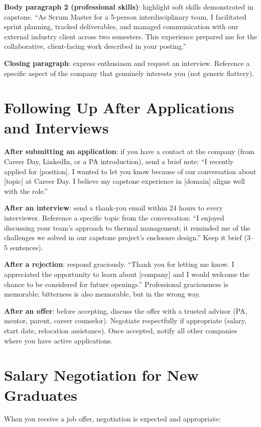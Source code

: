 \textbf{Body paragraph 2 (professional skills)}: highlight soft skills demonstrated in capstone. ``As Scrum Master for a 5-person interdisciplinary team, I facilitated sprint planning, tracked deliverables, and managed communication with our external industry client across two semesters. This experience prepared me for the collaborative, client-facing work described in your posting.''

\textbf{Closing paragraph}: express enthusiasm and request an interview. Reference a specific aspect of the company that genuinely interests you (not generic flattery).

\section{Following Up After Applications and Interviews}
\textbf{After submitting an application}: if you have a contact at the company (from Career Day, LinkedIn, or a PA introduction), send a brief note: ``I recently applied for [position]. I wanted to let you know because of our conversation about [topic] at Career Day. I believe my capstone experience in [domain] aligns well with the role.''

\textbf{After an interview}: send a thank-you email within 24 hours to every interviewer. Reference a specific topic from the conversation: ``I enjoyed discussing your team's approach to thermal management; it reminded me of the challenges we solved in our capstone project's enclosure design.'' Keep it brief (3--5 sentences).

\textbf{After a rejection}: respond graciously. ``Thank you for letting me know. I appreciated the opportunity to learn about [company] and I would welcome the chance to be considered for future openings.'' Professional graciousness is memorable; bitterness is also memorable, but in the wrong way.

\textbf{After an offer}: before accepting, discuss the offer with a trusted advisor (PA, mentor, parent, career counselor). Negotiate respectfully if appropriate (salary, start date, relocation assistance). Once accepted, notify all other companies where you have active applications.



\section{Salary Negotiation for New Graduates}
When you receive a job offer, negotiation is expected and appropriate:

